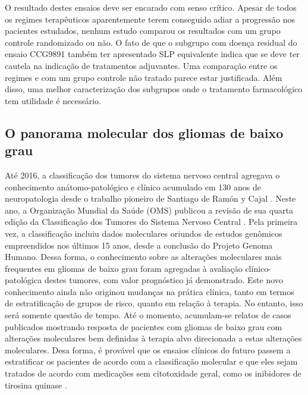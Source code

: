 \documentclass[11pt,a4paper,oldfontcommands]{memoir}
\begin{document}
O resultado destes ensaios deve ser encarado com senso crítico. Apesar de todos os regimes terapêuticos aparentemente terem conseguido adiar a progressão nos pacientes estudados, nenhum estudo comparou os resultados com um grupo controle randomizado ou não. O fato de que o subgrupo com doença residual do ensaio CCG9891 também ter apresentado SLP equivalente indica que se deve ter cautela na indicação de tratamentos adjuvantes. Uma comparação entre os regimes e com um grupo controle não tratado parece estar justificada. Além disso, uma melhor caracterização dos subgrupos onde o tratamento farmacológico tem utilidade é necessário.

\subsection{O panorama molecular dos gliomas de baixo grau}

Até 2016, a classificação dos tumores do sistema nervoso central agregava o conhecimento anátomo-patológico e clínico acumulado em 130 anos de neuropatologia desde o trabalho pioneiro de Santiago de Ramón y Cajal \cite{pinero2014santiago}. Neste ano, a Organização Mundial da Saúde (OMS) publicou a revisão de sua quarta edição da Classificação dos Tumores do Sistema Nervoso Central \cite{Louis2016}. Pela primeira vez, a classificação incluiu dados moleculares oriundos de estudos genômicos empreendidos nos últimos 15 anos, desde a conclusão do Projeto Genoma Humano. Dessa forma, o conhecimento sobre as alterações moleculares mais frequentes em gliomas de baixo grau foram agregadas à avaliação clínico-patológica destes tumores, com valor prognóstico já demonstrado. Este novo conhecimento ainda não originou mudanças na prática clínica, tanto em termos de estratificação de grupos de risco, quanto em relação à terapia. No entanto, isso será somente questão de tempo. Até o momento, acumulam-se relatos de casos publicados mostrando resposta de pacientes com gliomas de baixo grau com alterações moleculares bem definidas à terapia alvo direcionada a estas alterações moleculares. Desa forma, é provável que os ensaios clínicos do futuro passem a estratificar os pacientes de acordo com a classificação molecular e que eles sejam tratados de acordo com medicações sem citotoxidade geral, como os inibidores de tirosina quinase \cite{now209}.
\end{document}
